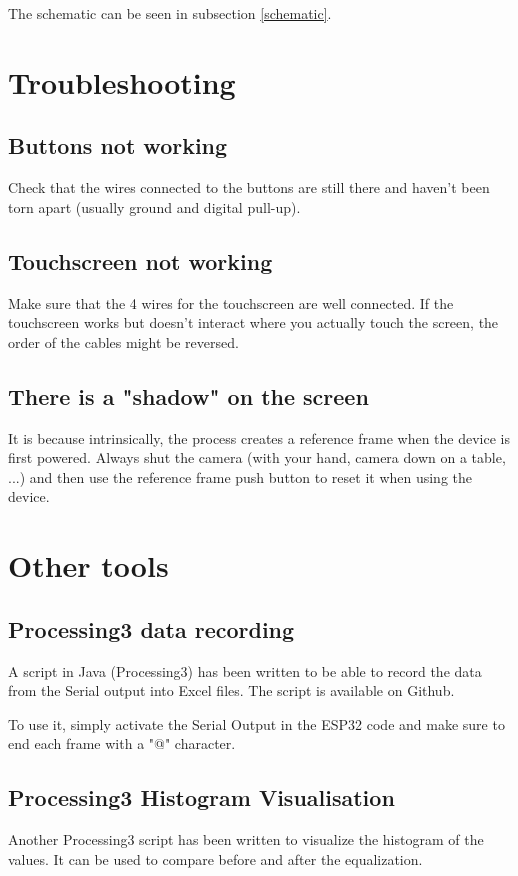 \documentclass[a4paper]{article}
\begin{document}
The schematic can be seen in subsection \ref{schematic}.

\newpage

\section{Troubleshooting}
\subsection{Buttons not working}
Check that the wires connected to the buttons are still there and haven't been torn apart (usually ground and digital pull-up).
\subsection{Touchscreen not working}
Make sure that the 4 wires for the touchscreen are well connected. If the touchscreen works but doesn't interact where you actually touch the screen, the order of the cables might be reversed.

\subsection{There is a "shadow" on the screen}
It is because intrinsically, the process creates a reference frame when the device is first powered. Always shut the camera (with your hand, camera down on a table, ...) and then use the reference frame push button to reset it when using the device. 

\section{Other tools}
\subsection{Processing3 data recording}
A script in Java (Processing3) has been written to be able to record the data from the Serial output into Excel files.
The script is available on Github.

To use it, simply activate the Serial Output in the ESP32 code and make sure to end each frame with a "@" character.  

\subsection{Processing3 Histogram Visualisation}
Another Processing3 script has been written to visualize the histogram of the values. It can be used to compare before and after the equalization.
\end{document}
